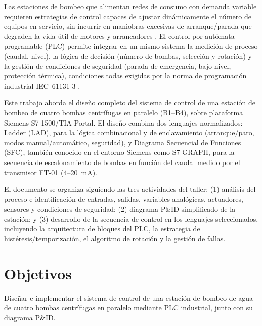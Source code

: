 \documentclass[conference]{IEEEtran}
\begin{document}
Las estaciones de bombeo que alimentan redes de consumo con demanda variable requieren estrategias de control capaces de ajustar dinámicamente el número de equipos en servicio, sin incurrir en maniobras excesivas de arranque/parada que degraden la vida útil de motores y arrancadores \cite{siemens_s71500}. El control por autómata programable (PLC) permite integrar en un mismo sistema la medición de proceso (caudal, nivel), la lógica de decisión (número de bombas, selección y rotación) y la gestión de condiciones de seguridad (parada de emergencia, bajo nivel, protección térmica), condiciones todas exigidas por la norma de programación industrial IEC~61131-3 \cite{iec61131_3}.

Este trabajo aborda el diseño completo del sistema de control de una estación de bombeo de cuatro bombas centrífugas en paralelo (B1--B4), sobre plataforma Siemens S7-1500/TIA Portal. El diseño combina dos lenguajes normalizados: Ladder (LAD), para la lógica combinacional y de enclavamiento (arranque/paro, modos manual/automático, seguridad), y Diagrama Secuencial de Funciones (SFC), también conocido en el entorno Siemens como S7-GRAPH, para la secuencia de escalonamiento de bombas en función del caudal medido por el transmisor FT-01 (4--20~mA).

El documento se organiza siguiendo las tres actividades del taller: (1) análisis del proceso e identificación de entradas, salidas, variables analógicas, actuadores, sensores y condiciones de seguridad; (2) diagrama P\&ID simplificado de la estación; y (3) desarrollo de la secuencia de control en los lenguajes seleccionados, incluyendo la arquitectura de bloques del PLC, la estrategia de histéresis/temporización, el algoritmo de rotación y la gestión de fallas.

\section{Objetivos}

Diseñar e implementar el sistema de control de una estación de bombeo de agua de cuatro bombas centrífugas en paralelo mediante PLC industrial, junto con su diagrama P\&ID.
\end{document}
